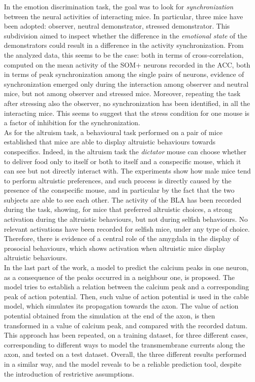 \documentclass[12pt, a4paper]{report}
\begin{document}
In the  emotion discrimination task, the goal was to look for \textit{synchronization} between the neural activities of interacting mice. In particular, three mice have been adopted: observer, neutral demonstrator, stressed demonstrator. This subdivision aimed to inspect whether the difference in the \textit{emotional state} of the demonstrators could result in a difference in the activity synchronization. From the analyzed data, this seems to be the case: both in terms of cross-correlation, computed on the mean activity of the SOM+ neurons recorded in the ACC, both in terms of peak synchronization among the single pairs of neurons, evidence of synchronization emerged only during the interaction among  observer and  neutral mice, but not among  observer and  stressed mice. Moreover, repeating the task after stressing also the observer, no synchronization has been identified, in all the interacting mice.
This seems to suggest that the stress condition for one mouse is a factor of inhibition for the synchronization. \\

As for the altruism task, a behavioural task performed on a pair of mice established that mice are able to display altruistic behaviours towards conspecifics. Indeed, in the altruism task the \textit{dictator} mouse can choose whether to deliver food only to itself or both to itself and a conspecific mouse, which it can see but not directly interact with. The experiments show how male mice tend to perform altruistic preferences, and such process is directly caused by the presence of the conspecific mouse, and in particular  by the fact that the two subjects are able to see each other. The activity of the BLA has been recorded during the task, showing, for mice that preferred altruistic choices, a strong activation during the altruistic behaviours, but not during selfish behaviours. No relevant activations have been recorded for selfish mice, under any type of choice. Therefore, there is evidence of a central role of the amygdala in the display of prosocial behaviours, which shows activation when altruistic mice display altruistic behaviours.\\

In the last part of the work, a model to predict the calcium peaks in one neuron, as a consequence of the peaks occurred in a neighbour one, is proposed. The model tries to establish a relation between the calcium peak and a corresponding peak of action potential. Then, such value of action potential is used in the cable model, which simulates its propagation towards the axon. The value of action potential obtained from the simulation at the end of the axon, is then transformed in a value of calcium peak, and compared with the recorded datum. This approach has been repeated, on a training dataset, for three different cases, corresponding to different ways to model the transmembrane currents along the axon, and tested on a test dataset. Overall, the three different results performed in a similar way, and the model reveals to be a reliable prediction tool, despite the introduction of restrictive assumptions.\\
\end{document}
